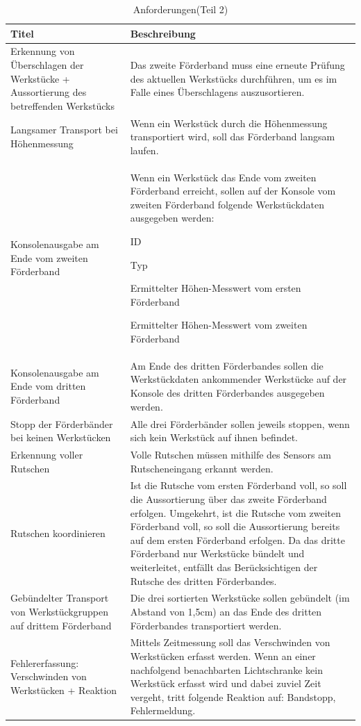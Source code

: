\documentclass[a4paper, 11pt]{article}
\begin{document}
\newpage

\begin{table}[H]
\centering
    \begin{tabularx}{\textwidth}{|X|X|}
    \hline
    \textbf{Titel}&\textbf{Beschreibung}\\
    \hline
    Erkennung von Überschlagen der Werkstücke + Aussortierung des betreffenden Werkstücks&Das zweite Förderband muss eine erneute Prüfung des aktuellen Werkstücks durchführen, um es im Falle eines Überschlagens auszusortieren.\\
    \hline
    Langsamer Transport bei Höhenmessung&Wenn ein Werkstück durch die Höhenmessung transportiert wird, soll das Förderband langsam laufen.\\
    \hline
    Konsolenausgabe am Ende vom zweiten Förderband&Wenn ein Werkstück das Ende vom zweiten Förderband erreicht, sollen auf der Konsole vom zweiten Förderband folgende Werkstückdaten ausgegeben werden:
    \begin{compactenum}[-]
        \item ID 
        \item Typ 
        \item Ermittelter Höhen-Messwert vom ersten Förderband 
        \item Ermittelter Höhen-Messwert vom zweiten Förderband 
    \end{compactenum}\\
    \hline
    Konsolenausgabe am Ende vom dritten Förderband&Am Ende des dritten Förderbandes sollen die Werkstückdaten ankommender Werkstücke auf der Konsole des dritten Förderbandes ausgegeben werden.\\
    \hline
    Stopp der Förderbänder bei keinen Werkstücken&Alle drei Förderbänder sollen jeweils stoppen, wenn sich kein Werkstück auf ihnen befindet.\\
    \hline
    Erkennung voller Rutschen&Volle Rutschen müssen mithilfe des Sensors am Rutscheneingang erkannt werden.\\
    \hline
    Rutschen koordinieren&Ist die Rutsche vom ersten Förderband voll, so soll die Aussortierung über das zweite Förderband erfolgen. Umgekehrt, ist die Rutsche vom zweiten Förderband voll, so soll die Aussortierung bereits auf dem ersten Förderband erfolgen. Da das dritte Förderband nur Werkstücke bündelt und weiterleitet, entfällt das Berücksichtigen der Rutsche des dritten Förderbandes.\\
    \hline
    Gebündelter Transport von Werkstückgruppen auf drittem Förderband&Die drei sortierten Werkstücke sollen gebündelt (im Abstand von 1,5cm) an das Ende des dritten Förderbandes transportiert werden.\\
    \hline
    Fehlererfassung: Verschwinden von Werkstücken + Reaktion&Mittels Zeitmessung soll das Verschwinden von Werkstücken erfasst werden. Wenn an einer nachfolgend benachbarten Lichtschranke kein Werkstück erfasst wird und dabei zuviel Zeit vergeht, tritt folgende Reaktion auf: Bandstopp, Fehlermeldung.\\
    \hline
    \end{tabularx}
    \caption{Anforderungen(Teil 2)}
    \label{anf2}
\end{table}
\end{document}
